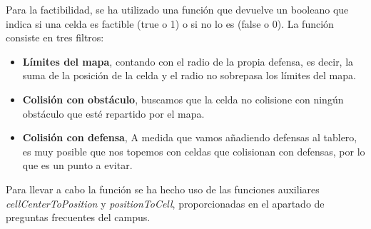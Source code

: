 
Para la factibilidad, se ha utilizado una función que devuelve un booleano que 
indica si una celda es factible (true o 1) o si no lo es (false o 0).
La función consiste en tres filtros:
\begin{itemize}
    \item \textbf{Límites del mapa}, contando con el radio
    de la propia defensa, es decir, la suma de la posición de la celda y el radio no sobrepasa los límites del mapa.
    \item \textbf{Colisión con obstáculo}, buscamos que la celda no colisione con ningún obstáculo 
    que esté repartido por el mapa.
    \item \textbf{Colisión con defensa}, A medida que vamos añadiendo defensas al 
    tablero, es muy posible que nos topemos con celdas que colisionan con defensas, por lo que es un punto a evitar.
\end{itemize}
Para llevar a cabo la función se ha hecho uso de las funciones auxiliares \textit{cellCenterToPosition} y \textit{positionToCell}, proporcionadas
en el apartado de preguntas frecuentes del campus.
\pagebreak